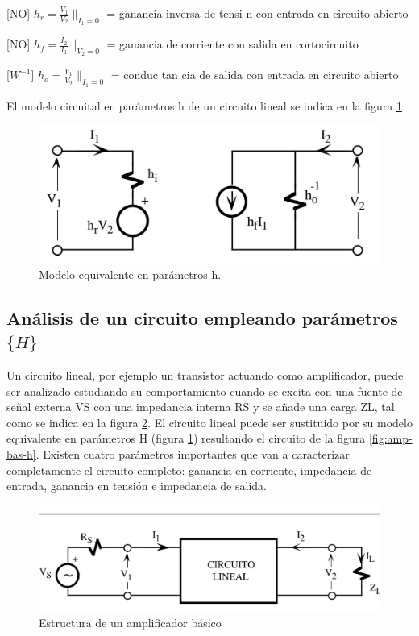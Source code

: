 \documentclass[12pt, a4paper]{article}
\begin{document}
    [NO] $h_r = \frac{V_1}{V_2}\|_{I_1 = 0}$ = ganancia inversa de tensi n con entrada en circuito abierto

    [NO] $h_f = \frac{I_2}{I_1}\|_{V_2 = 0}$ = ganancia de corriente con salida en cortocircuito

    [$W^{-1}$] $h_o = \frac{V_1}{V_2}\|_{I_1 = 0}$ = conduc tan cia de salida con entrada en circuito abierto

    El modelo circuital en parámetros h de un circuito lineal se indica en la figura \ref{fig:h}.


    \begin{figure}[h!]
        \centering
        \includegraphics[height=4cm\textwidth]{parametrosh.jpg}
        \caption{Modelo equivalente en parámetros h.}
        \label{fig:h}
    \end{figure}

    \subsection{Análisis de un circuito empleando parámetros $\{H\}$}

    Un circuito lineal, por ejemplo un transistor actuando como amplificador, puede ser analizado estudiando su comportamiento cuando se excita con una fuente de señal externa VS con una impedancia interna RS y se añade una carga ZL, tal como se indica en la figura \ref{fig:amp-bas}. El circuito lineal puede ser sustituido por su modelo equivalente en parámetros {H} (figura \ref{fig:h}) resultando el circuito de la figura \ref{fig:amp-bas-h}. Existen cuatro parámetros importantes que van a caracterizar completamente el circuito completo: ganancia en corriente, impedancia de entrada, ganancia en tensión e impedancia de salida.

    \begin{figure}[h!]
        \centering
        \includegraphics[height=4cm\textwidth]{amp-bas.jpg}
        \caption{Estructura de un amplificador básico}
        \label{fig:amp-bas}
    \end{figure}
\end{document}
